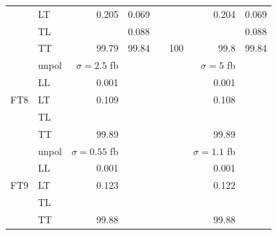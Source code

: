 \begin{table}[h]
{\begin{tabular}{llrrrrrr}
 & LT & \num{0.205} & \num{0.069} &  &  & \num{0.204} & \num{0.069} \\
 & TL &  & \num{0.088} &  &  &  & \num{0.088} \\
 & TT & \num{99.79} & \num{99.84} &  & \num{100} & \num{99.8} & \num{99.84} \\
\midrule
\multirow{5}{*}{FT8}
 & unpol & $\sigma = \num{2.5}$ fb &  &  &  & $\sigma = \num{5}$ fb &  \\
 & LL & \num{0.001} &  &  &  & \num{0.001} &  \\
 & LT & \num{0.109} &  &  &  & \num{0.108} &  \\
 & TL &  &  &  &  &  &  \\
 & TT & \num{99.89} &  &  &  & \num{99.89} &  \\
\midrule
\multirow{5}{*}{FT9}
 & unpol & $\sigma = \num{0.55}$ fb &  &  &  & $\sigma = \num{1.1}$ fb &  \\
 & LL & \num{0.001} &  &  &  & \num{0.001} &  \\
 & LT & \num{0.123} &  &  &  & \num{0.122} &  \\
 & TL &  &  &  &  &  &  \\
 & TT & \num{99.88} &  &  &  & \num{99.88} &  \\
\bottomrule
\end{tabular}
}%
\end{table}